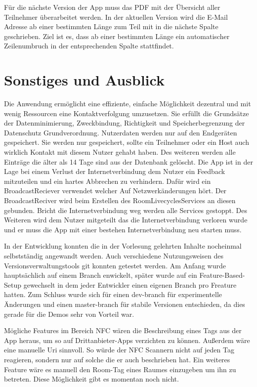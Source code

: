 Für die nächste Version der App muss das PDF mit der Übersicht aller Teilnehmer überarbeitet werden. In der aktuellen Version wird die E-Mail Adresse ab einer bestimmten Länge zum Teil mit in die nächste Spalte geschrieben. Ziel ist es, dass ab einer bestimmten Länge ein automatischer Zeilenumbruch in der entsprechenden Spalte stattfindet.

\section{Sonstiges und Ausblick}
\label{sec:FuZ}
Die Anwendung ermöglicht eine effiziente, einfache Möglichkeit dezentral und mit wenig Ressourcen eine Kontaktverfolgung umzusetzen.
Sie erfüllt die Grundsätze der Datenminimierung, Zweckbindung, Richtigkeit und Speicherbegrenzung der Datenschutz Grundverordnung. Nutzerdaten werden nur auf den Endgeräten gespeichert. 
Sie werden nur gespeichert, sollte ein Teilnehmer oder ein Host auch wirklich Kontakt mit diesem Nutzer gehabt haben. 
Des weiteren werden alle Einträge die älter als 14 Tage sind aus der Datenbank gelöscht.
Die App ist in der Lage bei einem Verlust der Internetverbindung dem Nutzer ein Feedback mitzuteilen und ein hartes Abbrechen zu verhindern. Dafür wird ein BroadcastReciever verwendet welcher Auf Netzwerkänderungen hört. Der BroadcastReciver wird beim Erstellen des RoomLivecyclesServices an diesen gebunden. Bricht die Internetverbindung weg werden alle Services gestoppt. Des Weiteren wird dem Nutzer mitgeteilt das die Internetverbindung verloren wurde und er muss die App mit einer bestehen Internetverbindung neu starten muss.



In der Entwicklung konnten die in der Vorlesung gelehrten Inhalte nocheinmal selbstständig angewandt werden. 
Auch verschiedene Nutzungsweisen des Versionsverwaltungstools git konnten getestet werden. 
Am Anfang wurde hauptsächlich auf einem Branch enwickelt, später wurde auf ein Feature-Based-Setup gewechselt in dem jeder Entwickler einen eigenen Branch pro Freature hatten. 
Zum Schluss wurde sich für einen dev-branch für experimentelle Änderungen und einen master-branch für stabile Versionen entschieden, da dies gerade für die Demos sehr von Vorteil war.


Mögliche Features im Bereich NFC wären die Beschreibung eines Tags aus der App heraus, um so auf Drittanbieter-Apps verzichten zu können. 
Außerdem wäre eine manuelle Uri sinnvoll. So würde der NFC Scannern nicht auf jeden Tag reagieren, sondern nur auf solche die er auch beschrieben hat. 
Ein weiteres Feature wäre es manuell den Room-Tag eines Raumes einzugeben um ihn zu betreten. Diese Möglichkeit gibt es momentan noch nicht.

